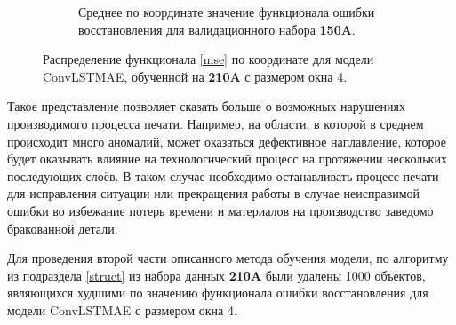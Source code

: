 \documentclass{article}
\begin{document}
\begin{figure}[H]
\begin{subfigure}{.47\textwidth}
            \caption{Среднее по координате значение функционала ошибки восстановления для валидационного набора \textbf{150A}.}\label{lstm_4_window_xy_test_before}
        \end{subfigure}
        \caption{Распределение функционала \eqref{mse} по координате для модели ConvLSTMAE, обученной на \textbf{210A} с размером окна 4.}\label{lstm_xy_before}
    \end{figure}

    Такое представление позволяет сказать больше о возможных нарушениях производимого процесса печати. Например, на области, в которой в среднем происходит много аномалий, может оказаться дефективное наплавление, которое будет оказывать влияние на технологический процесс на протяжении нескольких последующих слоёв. В таком случае необходимо останавливать процесс печати для исправления ситуации или прекращения работы в случае неисправимой ошибки во избежание потерь времени и материалов на производство заведомо бракованной детали.

    Для проведения второй части описанного метода обучения модели, по алгоритму из подраздела \ref{struct} из набора данных \textbf{210A} были удалены 1000 объектов, являющихся худшими по значению функционала ошибки восстановления для модели ConvLSTMAE с размером окна 4. 
\end{document}
